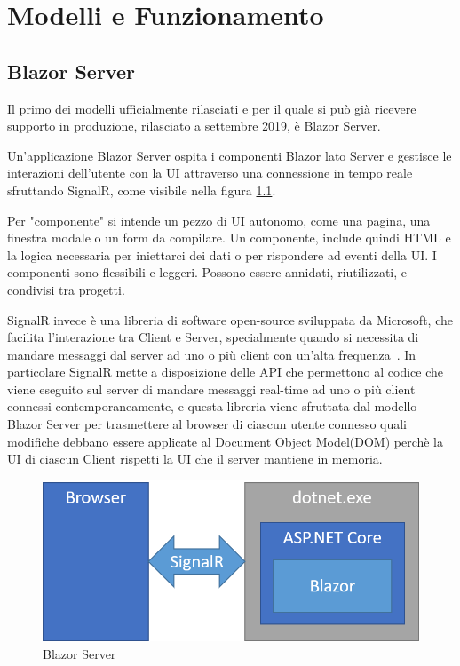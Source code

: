 \chapter{Modelli e Funzionamento}\label{cap:modefunz}
\section{Blazor Server}\label{sez:bserver}
Il primo dei modelli ufficialmente rilasciati e per il quale si pu\`o gi\`a ricevere supporto in produzione, rilasciato a settembre 2019\cite{blazorServerRelease}, \`e Blazor Server.

Un'applicazione Blazor Server ospita i componenti Blazor lato Server e gestisce le interazioni dell'utente con la UI attraverso una connessione in tempo reale sfruttando SignalR, come visibile nella figura \ref{fig:BlazorServer}.

Per "componente" si intende un pezzo di UI autonomo, come una pagina, una finestra modale o un form da compilare.
Un componente, include quindi HTML e la logica necessaria per iniettarci dei dati o per rispondere ad eventi della UI. 
I componenti sono flessibili e leggeri. Possono essere annidati, riutilizzati, e condivisi tra progetti\cite{whatIsAComponent}.

SignalR invece \`e una libreria di software open-source sviluppata da Microsoft, che facilita l'interazione tra Client e Server, specialmente quando si necessita di mandare messaggi dal server ad uno o pi\`u client con un'alta frequenza~\cite{signalR}.
In particolare SignalR mette a disposizione delle API che permettono al codice che viene eseguito sul server di mandare messaggi real-time ad uno o pi\`u client connessi contemporaneamente, e questa libreria viene sfruttata dal modello Blazor Server per trasmettere al browser di ciascun utente connesso quali modifiche debbano essere applicate al Document Object Model(DOM) perch\`e la UI di ciascun Client rispetti la UI che il server mantiene in memoria.

\begin{figure}[H]
	\centerline{\includegraphics[scale=0.6]{figure/blazor-server.png}}
	\caption{Blazor Server}
	\label{fig:BlazorServer}
\end{figure}

